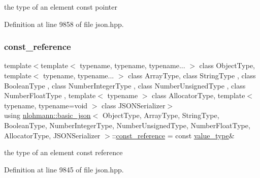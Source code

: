 the type of an element const pointer 



Definition at line 9858 of file json.\+hpp.

\mbox{\label{classnlohmann_1_1basic__json_a4057c5425f4faacfe39a8046871786ca}} 
\subsubsection{\texorpdfstring{const\+\_\+reference}{const\_reference}}
{\footnotesize\ttfamily template$<$template$<$ typename, typename, typename... $>$ class Object\+Type, template$<$ typename, typename... $>$ class Array\+Type, class String\+Type , class Boolean\+Type , class Number\+Integer\+Type , class Number\+Unsigned\+Type , class Number\+Float\+Type , template$<$ typename $>$ class Allocator\+Type, template$<$ typename, typename=void $>$ class J\+S\+O\+N\+Serializer$>$ \\
using \hyperlink{classnlohmann_1_1basic__json}{nlohmann\+::basic\+\_\+json}$<$ Object\+Type, Array\+Type, String\+Type, Boolean\+Type, Number\+Integer\+Type, Number\+Unsigned\+Type, Number\+Float\+Type, Allocator\+Type, J\+S\+O\+N\+Serializer $>$\+::\hyperlink{classnlohmann_1_1basic__json_a4057c5425f4faacfe39a8046871786ca}{const\+\_\+reference} =  const \hyperlink{classnlohmann_1_1basic__json_a2b3297873b70c080837e8eedc4fec32f}{value\+\_\+type}\&}



the type of an element const reference 



Definition at line 9845 of file json.\+hpp.

\mbox{\label{classnlohmann_1_1basic__json_a72be3c24bfa24f0993d6c11af03e7404}} 
